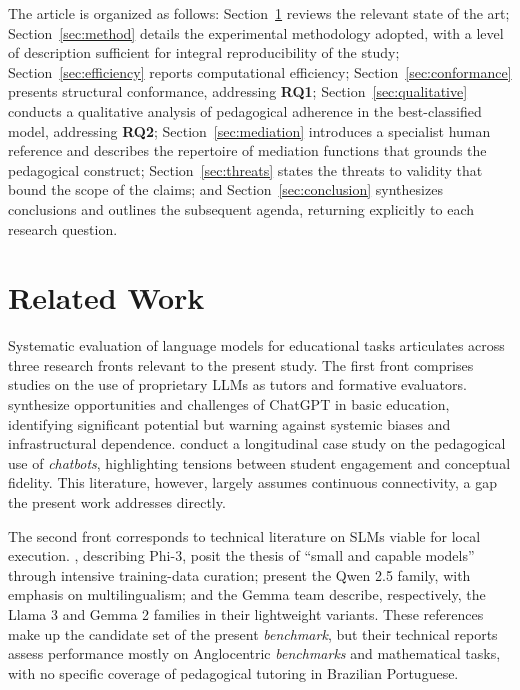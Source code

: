\documentclass{sbc2023}%
\begin{document}
The article is organized as follows: Section~\ref{sec:related} reviews the relevant state of the art; Section~\ref{sec:method} details the experimental methodology adopted, with a level of description sufficient for integral reproducibility of the study; Section~\ref{sec:efficiency} reports computational efficiency; Section~\ref{sec:conformance} presents structural conformance, addressing \textbf{RQ1}; Section~\ref{sec:qualitative} conducts a qualitative analysis of pedagogical adherence in the best-classified model, addressing \textbf{RQ2}; Section~\ref{sec:mediation} introduces a specialist human reference and describes the repertoire of mediation functions that grounds the pedagogical construct; Section~\ref{sec:threats} states the threats to validity that bound the scope of the claims; and Section~\ref{sec:conclusion} synthesizes conclusions and outlines the subsequent agenda, returning explicitly to each research question.

\section{Related Work}
\label{sec:related}

Systematic evaluation of language models for educational tasks articulates across three research fronts relevant to the present study. The first front comprises studies on the use of proprietary LLMs as tutors and formative evaluators. \citet{kasneci2023chatgpt} synthesize opportunities and challenges of ChatGPT in basic education, identifying significant potential but warning against systemic biases and infrastructural dependence. \citet{tlili2023devil} conduct a longitudinal case study on the pedagogical use of \textit{chatbots}, highlighting tensions between student engagement and conceptual fidelity. This literature, however, largely assumes continuous connectivity, a gap the present work addresses directly.

The second front corresponds to technical literature on SLMs viable for local execution. \citet{abdin2024phi3}, describing Phi-3, posit the thesis of ``small and capable models'' through intensive training-data curation; \citet{yang2024qwen25} present the Qwen 2.5 family, with emphasis on multilingualism; \citet{grattafiori2024llama3} and the Gemma team \citep{gemma2024} describe, respectively, the Llama 3 and Gemma 2 families in their lightweight variants. These references make up the candidate set of the present \textit{benchmark}, but their technical reports assess performance mostly on Anglocentric \textit{benchmarks} and mathematical tasks, with no specific coverage of pedagogical tutoring in Brazilian Portuguese.
\end{document}
